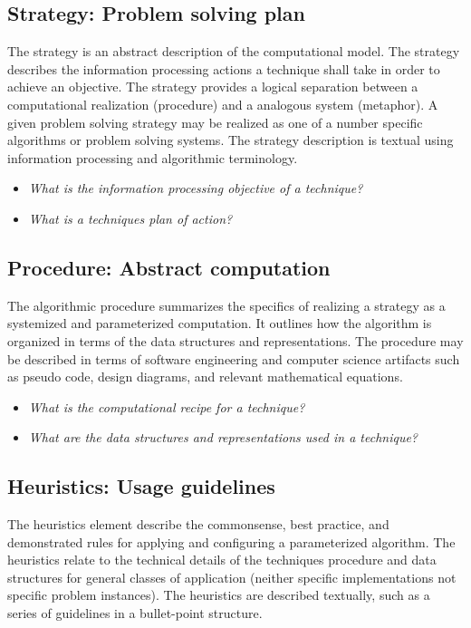\documentclass[a4paper, 11pt]{article}
\begin{document}
\subsection{Strategy: Problem solving plan}
The strategy is an abstract description of the computational model. The strategy describes the information processing actions a technique shall take in order to achieve an objective. The strategy provides a logical separation between a computational realization (procedure) and a analogous system (metaphor). A given problem solving strategy may be realized as one of a number specific algorithms or problem solving systems. The strategy description is textual using information processing and algorithmic terminology.

\begin{itemize}
	\item \emph{What is the information processing objective of a technique?}
	\item \emph{What is a techniques plan of action?}
\end{itemize}

\subsection{Procedure: Abstract computation}
The algorithmic procedure summarizes the specifics of realizing a strategy as a systemized and parameterized computation. It outlines how the algorithm is organized in terms of the data structures and representations. The procedure may be described in terms of software engineering and computer science artifacts such as pseudo code, design diagrams, and relevant mathematical equations.

\begin{itemize}
	\item \emph{What is the computational recipe for a technique?}
	\item \emph{What are the data structures and representations used in a technique?}
\end{itemize}

\subsection{Heuristics: Usage guidelines}
The heuristics element describe the commonsense, best practice, and demonstrated rules for applying and configuring a parameterized algorithm. The heuristics relate to the technical details of the techniques procedure and data structures for general classes of application (neither specific implementations not specific problem instances). The heuristics are described textually, such as a series of guidelines in a bullet-point structure.
\end{document}
